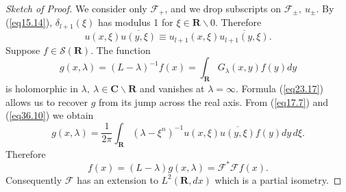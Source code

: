 \documentclass{surv-l}
\theoremstyle{plain}
\theoremstyle{definition}
\numberwithin{equation}{chapter}
\begin{document}
\begin{proof}[Sketch of Proof]
We consider only $\mathscr{F}_{+}$, and we drop subscripts on $\mathscr{F}_{\pm},\  u_{\pm}$. By (\ref{eq15.14}), $\delta_{l+1}(\xi)$ has modulus 1 for $\xi\in \mathbf{R}\backslash 0$. Therefore
\begin{equation}\label{eq36.10}
u(x, \xi)\overline{u(y, \xi)}\equiv u_{l+1}(x, \xi)\overline{u_{l+1}(y, \xi)}.
\end{equation}
Suppose $f\in \mathscr{S}(\mathbf{R})$. The function
\begin{equation*}
g(x, \lambda)=(L-\lambda)^{-1}f(x)=\int_{\mathbf{R}}G_{\lambda}(x, y)f(y)dy
\end{equation*}
is holomorphic in $\lambda,\ \lambda \in \mathbf{C}\backslash \mathbf{R}$ and vanishes at $\lambda =\infty$. Formula (\ref{eq23.17}) allows us to recover $g$ from its jump across the real axis. From (\ref{eq17.7}) and (\ref{eq36.10}) we obtain
\begin{equation*}
 g(x, \lambda)=\frac{1}{2\pi}\int_{\mathbf{R}}(\lambda-\xi^{n})^{-1}u(x, \xi)\overline{u(y,\xi)}f(y)dy\,d\xi.
\end{equation*}
Therefore
\begin{equation*}
f(x)=(L-\lambda)g(x, \lambda)=\mathscr{F}^{*}\mathscr{F}f(x).
\end{equation*}
Consequently $\mathscr{F}$ has an extension to $L^{2} (\mathbf{R}, dx)$ which is a partial isometry.


\end{proof}
\end{document}
